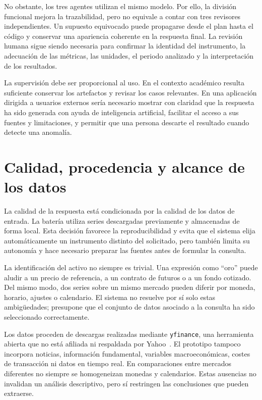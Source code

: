 No obstante, los tres agentes utilizan el mismo modelo. Por ello, la división funcional mejora la trazabilidad, pero no equivale a contar con tres revisores independientes. Un supuesto equivocado puede propagarse desde el plan hasta el código y conservar una apariencia coherente en la respuesta final. La revisión humana sigue siendo necesaria para confirmar la identidad del instrumento, la adecuación de las métricas, las unidades, el periodo analizado y la interpretación de los resultados.

La supervisión debe ser proporcional al uso. En el contexto académico resulta suficiente conservar los artefactos y revisar los casos relevantes. En una aplicación dirigida a usuarios externos sería necesario mostrar con claridad que la respuesta ha sido generada con ayuda de inteligencia artificial, facilitar el acceso a sus fuentes y limitaciones, y permitir que una persona descarte el resultado cuando detecte una anomalía.

\section{Calidad, procedencia y alcance de los datos}

La calidad de la respuesta está condicionada por la calidad de los datos de entrada. La batería utiliza series descargadas previamente y almacenadas de forma local. Esta decisión favorece la reproducibilidad y evita que el sistema elija automáticamente un instrumento distinto del solicitado, pero también limita su autonomía y hace necesario preparar las fuentes antes de formular la consulta.

La identificación del activo no siempre es trivial. Una expresión como ``oro'' puede aludir a un precio de referencia, a un contrato de futuros o a un fondo cotizado. Del mismo modo, dos series sobre un mismo mercado pueden diferir por moneda, horario, ajustes o calendario. El sistema no resuelve por sí solo estas ambigüedades; presupone que el conjunto de datos asociado a la consulta ha sido seleccionado correctamente.

Los datos proceden de descargas realizadas mediante \texttt{yfinance}, una herramienta abierta que no está afiliada ni respaldada por Yahoo~\cite{yfinance,yahoofinancehistorical}. El prototipo tampoco incorpora noticias, información fundamental, variables macroeconómicas, costes de transacción ni datos en tiempo real. En comparaciones entre mercados diferentes no siempre se homogeneizan monedas y calendarios. Estas ausencias no invalidan un análisis descriptivo, pero sí restringen las conclusiones que pueden extraerse.

